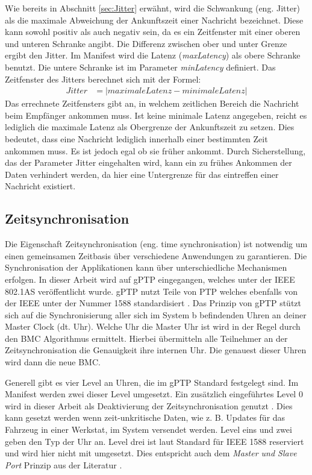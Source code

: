 \newpage

Wie bereits in Abschnitt \ref{sec:Jitter} erwähnt, wird die Schwankung (eng. Jitter) als die maximale Abweichung der Ankunftszeit einer Nachricht bezeichnet. Diese kann sowohl positiv als auch negativ sein, da es ein Zeitfenster mit einer oberen und unteren Schranke angibt. Die Differenz zwischen ober und unter Grenze ergibt den Jitter. Im Manifest wird die Latenz (\emph{maxLatency}) als obere Schranke benutzt. Die untere Schranke ist im Parameter \emph{minLatency} definiert.
Das Zeitfenster des Jitters berechnet sich mit der Formel:
\begin{align}
	Jitter &= |maximale Latenz - minimale Latenz|
\end{align}
Das errechnete Zeitfensters gibt an, in welchem zeitlichen Bereich die Nachricht beim Empfänger ankommen muss.
Ist keine minimale Latenz angegeben, reicht es lediglich die maximale Latenz als Obergrenze der Ankunftszeit zu setzen. Dies bedeutet, dass eine Nachricht lediglich innerhalb einer bestimmten Zeit ankommen muss. Es ist jedoch egal ob sie früher ankommt. Durch Sicherstellung, das der Parameter Jitter eingehalten wird, kann ein zu frühes Ankommen der Daten verhindert werden, da hier eine Untergrenze für das eintreffen einer Nachricht existiert.

\newpage
\subsection{Zeitsynchronisation}\label{sec:Zeitsync}
Die Eigenschaft Zeitsynchronisation (eng. time synchronisation) ist notwendig um einen gemeinsamen Zeitbasis über verschiedene Anwendungen zu garantieren. Die Synchronisation der Applikationen kann über unterschiedliche Mechanismen erfolgen. In dieser Arbeit wird auf \ac{gPTP} eingegangen, welches unter der IEEE 802.1AS \cite{IEEE802_1AS} veröffentlicht wurde. \ac{gPTP} nutzt Teile von \ac{PTP} welches ebenfalls von der IEEE unter der Nummer 1588 standardisiert \cite{PTPSync}. Das Prinzip von \ac{gPTP} stützt sich auf die Synchronisierung aller sich im System b befindenden Uhren an deiner Master Clock (dt. Uhr). Welche Uhr die Master Uhr ist wird in der Regel durch den \acf{BMC} Algorithmus ermittelt. Hierbei übermitteln alle Teilnehmer an der Zeitsynchronisation die Genauigkeit ihre internen Uhr. Die genauest dieser Uhren wird dann die neue \acl{BMC}\cite{AutomotiveEthernet}. 

Generell gibt es vier Level an Uhren, die im \ac{gPTP} Standard festgelegt sind. Im Manifest werden zwei dieser Level umgesetzt. Ein zusätzlich eingeführtes Level 0 wird in dieser Arbeit als Deaktivierung der Zeitsynchronisation genutzt \cite{BMC}. Dies kann gesetzt werden wenn zeit-unkritische Daten, wie z. B. Updates für das Fahrzeug in einer Werkstat, im System versendet werden. Level eins und zwei geben den Typ der Uhr an. Level drei ist laut Standard für IEEE 1588 reserviert und wird hier nicht mit umgesetzt. Dies entspricht auch dem \emph{Master und Slave Port} Prinzip aus der Literatur \cite{AutomotiveEthernet}.

